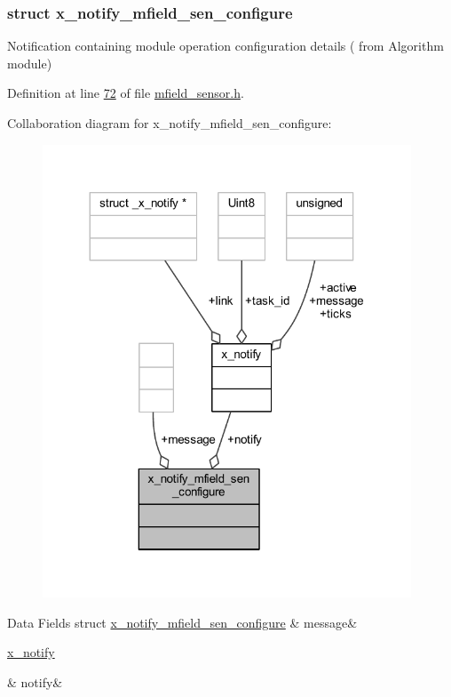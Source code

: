 \subsubsection{struct x\+\_\+notify\+\_\+mfield\+\_\+sen\+\_\+configure}
Notification containing module operation configuration details ( from Algorithm module) 

Definition at line \hyperlink{a00019_source_l00072}{72} of file \hyperlink{a00019_source}{mfield\+\_\+sensor.\+h}.



Collaboration diagram for x\+\_\+notify\+\_\+mfield\+\_\+sen\+\_\+configure\+:\nopagebreak
\begin{figure}[H]
\begin{center}
\leavevmode
\includegraphics[width=311pt]{df/d39/a00950}
\end{center}
\end{figure}
\begin{DoxyFields}{Data Fields}
\hypertarget{a00019_ae926905663cb8ca01f1bc2d670e428f5}{struct \hyperlink{a00019_dd/dd5/a00861}{x\+\_\+notify\+\_\+mfield\+\_\+sen\+\_\+configure}}\label{a00019_ae926905663cb8ca01f1bc2d670e428f5}
&
message&
\\
\hline

\hypertarget{a00019_a8e6a04c2283f9fd7b8dcbc62faba5847}{\hyperlink{a00036_df/d4c/a00851}{x\+\_\+notify}}\label{a00019_a8e6a04c2283f9fd7b8dcbc62faba5847}
&
notify&
\\
\hline

\end{DoxyFields}
\label{dc/d41/a00862}
\hypertarget{a00019_dc/d41/a00862}{}
